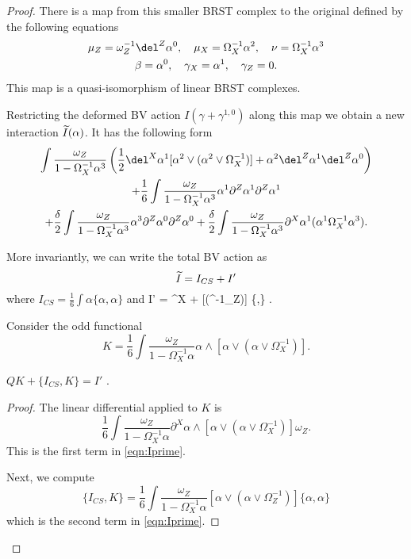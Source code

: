\documentclass[11pt]{amsart}
\begin{document}
\begin{proof}
There is a map from this smaller BRST complex to the original defined by the following equations 
\begin{multline}
\mu_Z = \omega_Z^{-1} \del^Z \alpha^0, \quad \mu_X = \Omega_X^{-1} \alpha^2, \quad \nu = \Omega_X^{-1} \alpha^3 \\
\beta = \alpha^0, \quad \gamma_X = \alpha^1 , \quad \gamma_Z = 0 .
\end{multline}
This map is a quasi-isomorphism of linear BRST complexes. 

Restricting the deformed BV action $I(\gamma+\gamma^{1,0})$ along this map we obtain a new interaction $\Tilde{I}(\alpha)$. 
It has the following form
\begin{multline}
\int \frac{\omega_Z}{1-\Omega^{-1}_X \alpha^3} \left(\frac12 \del^X \alpha^1  [ \alpha^2 \vee (\alpha^2 \vee \Omega_X^{-1})] + \alpha^2 \del^Z \alpha^1 \del^Z \alpha^0\right) \\
+ \frac16 \int \frac{\omega_Z}{1-\Omega^{-1}_X \alpha^3} \alpha^1 \partial^Z \alpha^1 \partial^Z \alpha^1 \\ + \frac{\delta}{2} \int \frac{\omega_Z}{1-\Omega^{-1}_X \alpha^3} \alpha^3 \partial^Z \alpha^0 \partial^Z \alpha^0 + \frac{\delta}{2} \int \frac{\omega_Z}{1-\Omega^{-1}_X \alpha^3} \partial^X \alpha^1 (\alpha^1 \Omega^{-1}_X \alpha^3) .
\end{multline}

More invariantly, we can write the total BV action as
\[
\Tilde{I} = I_{CS} + I' 
\]
where $I_{CS} = \frac16 \int \alpha\{\alpha,\alpha\}$ and 
\beqn
I' =  \int {} \partial^X  +  \int {} [\alpha \vee (\alpha \vee \Omega^{-1}_Z)] \{\alpha,\alpha\} .
\label{eqn:Iprime}
\eeqn

Consider the odd functional
\[
K = \frac16 \int \frac{\omega_Z}{1-\Omega^{-1}_X \alpha} \alpha \wedge [\alpha \vee (\alpha \vee \Omega_X^{-1})] .
\]

\begin{lem}
$Q K + \{I_{CS}, K\} = I'$ .
\end{lem}
\begin{proof}
The linear differential applied to $K$ is 
\[
\frac16 \int \frac{\omega_Z}{1-\Omega^{-1}_X \alpha} \partial^X \alpha \wedge [\alpha \vee (\alpha \vee \Omega_X^{-1})] \omega_Z .
\]
This is the first term in \eqref{eqn:Iprime}. 

Next, we compute
\[
\{I_{CS}, K\} = \frac16 \int \frac{\omega_Z}{1-\Omega^{-1}_X \alpha} [\alpha \vee (\alpha \vee \Omega^{-1}_Z)] \{\alpha,\alpha\} 
\]
which is the second term in \eqref{eqn:Iprime}. 
\end{proof}
\end{proof}
\end{document}
